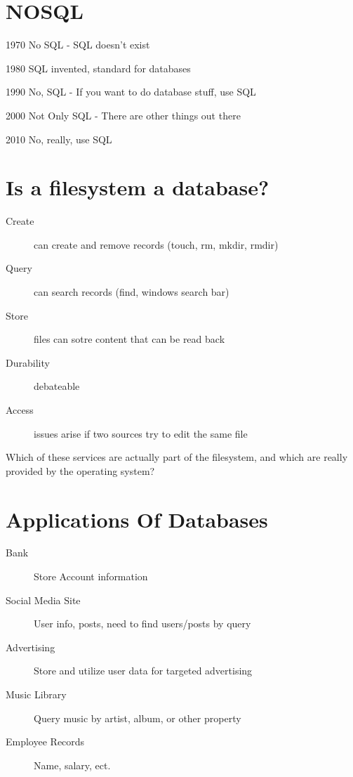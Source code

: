 \documentclass{article}
\begin{document}
\section{NOSQL}
\begin{description}
    \item{1970} No SQL - SQL doesn't exist
    \item{1980} SQL invented, standard for databases
    \item{1990} No, SQL - If you want to do database stuff, use SQL
    \item{2000} Not Only SQL - There are other things out there
    \item{2010} No, really, use SQL
\end{description}

\section{Is a filesystem a database?}
\begin{description}
    \item[Create] can create and remove records (touch, rm, mkdir, rmdir)
    \item[Query] can search records (find, windows search bar)
    \item[Store] files can sotre content that can be read back
    \item[Durability] debateable
    \item[Access] issues arise if two sources try to edit the same file
\end{description}
Which of these services are actually part of the filesystem, and which are
really provided by the operating system?

\section{Applications Of Databases}
\begin{description}
    \item[Bank] Store Account information
    \item[Social Media Site] User info, posts, need to find users/posts by query
    \item[Advertising] Store and utilize user data for targeted advertising
    \item[Music Library] Query music by artist, album, or other property
    \item[Employee Records] Name, salary, ect.
\end{description}
\end{document}
